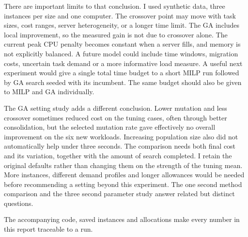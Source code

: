 \documentclass[10pt,a4paper]{article}
\begin{document}
There are important limits to that conclusion. I used synthetic data, three
instances per size and one computer. The crossover point may move with task
sizes, cost ranges, server heterogeneity, or a longer time limit. The GA includes
local improvement, so the measured gain is not due to crossover alone. The
current peak CPU penalty becomes constant when a server fills, and memory is
not explicitly balanced. A future model could include time windows, migration
costs, uncertain task demand or a more informative load measure. A useful next
experiment would give a single total time budget to a short MILP run followed
by GA search seeded with its incumbent. The same budget should also be given
to MILP and GA individually.

The GA setting study adds a different conclusion. Lower mutation and less
crossover sometimes reduced cost on the tuning cases, often through better
consolidation, but the selected mutation rate gave effectively no overall
improvement on the six new workloads. Increasing population size also did not
automatically help under three seconds. The comparison needs both final cost
and its variation, together with the amount of search completed. I retain the
original defaults rather than changing them on the strength of the tuning mean.
More instances, different demand profiles and longer allowances would be needed
before recommending a setting beyond this experiment. The one second method
comparison and the three second parameter study answer related but distinct
questions.

The accompanying code, saved instances and allocations make every number in
this report traceable to a run.
\end{document}
